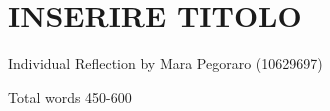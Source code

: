 \chapter{INSERIRE TITOLO}

\begin{flushright}
Individual Reflection by Mara Pegoraro (10629697)
\end{flushright}

Total words 450-600